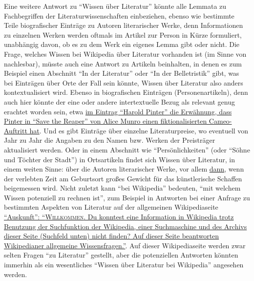 \documentclass[fontsize=12pt]{scrartcl}
\begin{document}
Eine weitere Antwort zu "`Wissen \"uber Li\-te\-ra\-tur"' k\"onnte alle Lemmata zu Fachbegriffen der Li\-te\-ra\-tur\-wissenschaften einbeziehen, ebenso wie bestimmte Teile bio\-grafischer Eintr\"age zu Autoren\textsuperscript{\tiny *} li\-te\-ra\-rischer Werke, denn Informationen zu einzelnen Werken werden oftmals im Artikel zur Person in K\"urze formuliert, unabh\"angig davon, ob es zu dem Werk ein eigenes Lemma gibt oder nicht. Die Frage, welches Wissen bei Wi\-ki\-pe\-dia \"uber Li\-te\-ra\-tur\- vorhanden ist (im Sinne von nachlesbar), m\"usste auch eine Antwort zu Artikeln beinhalten, in denen es zum Beispiel einen Abschnitt "`In der Li\-te\-ra\-tur"' oder "`In der Belletristik"' gibt, was bei Eintr\"agen \"uber Orte der Fall sein k\"onnte, Wissen \"uber Li\-te\-ra\-tur also anders kon\-tex\-tu\-a\-li\-siert wird. Ebenso in biografischen Eintr\"agen (Per\-so\-nenartikeln), denn auch \mbox{hier} k\"onnte der eine oder andere intertextuelle Bezug als relevant genug erachtet worden sein, etwa \href{https://de.wikipedia.org/w/index.php?title=Harold_Pinter\&oldid=138481028\#In_der_Literatur}{im Eintrag "`Harold Pinter"' die Erw\"ahnung, dass Pinter in "`Save the Reaper"' von Alice Munro einen fiktionalisierten Cameo-Auftritt hat}. Und es gibt Eintr\"age \"uber einzelne Li\-te\-ra\-tur\-preise, wo eventuell von Jahr zu Jahr die Angaben zu den Namen bzw. Werken der Preistr\"ager\textsuperscript{\tiny *} aktualisiert werden. Oder in einem Abschnitt wie "`Pers\"onlichkei\-ten"' (oder "`S\"ohne und T\"ochter der Stadt"') in Ortsartikeln findet sich Wissen \"uber Li\-te\-ra\-tur, in einem wei\-ten Sinne: \"uber die Autoren\textsuperscript{\tiny *} li\-te\-ra\-rischer Werke, vor allem \href{https://de.wikipedia.org/w/index.php?title=Ni\%C8\%9Bchidorf\&oldid=131299136\#Pers.C3.B6nlichkeiten}{dann}, wenn der verlebten Zeit am Geburtsort gro{\ss}es Gewicht f\"ur das k\"unstlerische Schaffen bei\-ge\-mes\-sen wird. Nicht zu\-letzt kann "`bei Wi\-ki\-pe\-dia"' bedeuten, "`mit welchem Wissen potenziell zu rechnen ist"', zum Beispiel in Antworten bei einer Anfrage zu bestimmten Aspekten von Li\-te\-ra\-tur auf der allgemeinen Wi\-ki\-pe\-diaseite \href{https://de.Wikipedia.org/w/index.php?title=Wikipedia:Auskunft\&oldid=137900868}{"`Aus\-kunft"': "`\textsc{Willkommen}. Du konntest eine Information in Wi\-ki\-pe\-dia trotz Benutzung der Suchfunktion der Wi\-ki\-pe\-dia, einer Suchmaschine und des Archivs dieser Seite (Suchfeld unten) nicht finden? Auf dieser Seite beantworten Wi\-ki\-pe\-dianer allgemeine Wissensfragen."'}. Auf dieser Wikipediaseite werden zwar selten Fragen "`zu Li\-te\-ra\-tur"' gestellt, aber die potenziellen Antworten k\"onnten immerhin als ein we\-sent\-liches "`Wissen \"uber Li\-te\-ra\-tur bei Wi\-ki\-pe\-dia"' angesehen werden.
\end{document}
